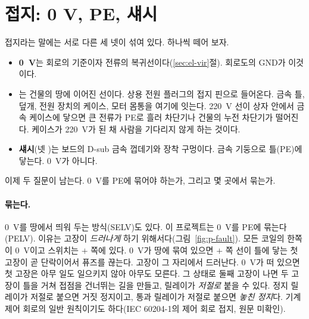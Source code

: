\section{접지: 0 V, PE, 섀시}\label{sec:p-earth}

\Why 접지라는 말에는 서로 다른 세 넷이 섞여 있다. 하나씩 떼어 보자.
\begin{itemize}
\item \textbf{0~V}는 회로의 기준이자 전류의 복귀선이다(\ref{sec:el-vir}절). 회로도의 GND가 이것이다.
\item {}는 건물의 땅에 이어진 선이다. 상용 전원 플러그의 접지 핀으로 들어온다. 금속 틀,
덮개, 전원 장치의 케이스, 모터 몸통을 여기에 잇는다. 220~V 선이 상자 안에서 금속 케이스에 닿으면 큰 전류가 PE로 흘러
차단기나 건물의 누전 차단기가 떨어진다. 케이스가 220~V가 된 채 사람을 기다리지 않게 하는 것이다.
\item \textbf{섀시}(넷 )는 보드의 D-sub 금속 껍데기와 장착 구멍이다. 금속 기둥으로 틀(PE)에 닿는다. 0~V가 아니다.
\end{itemize}

이제 두 질문이 남는다. 0~V를 PE에 묶어야 하는가, 그리고 몇 곳에서 묶는가.

\paragraph{묶는다.} 0~V를 땅에서 띄워 두는 방식(SELV)도 있다. 이 프로젝트는 0~V를 PE에 묶는다(PELV). 이유는 고장이 \emph{드러나게}
하기 위해서다(그림~\ref{fig:p-fault}). 모든 코일의 한쪽이 0~V이고 스위치는 $+$ 쪽에 있다. 0~V가 땅에 묶여 있으면 $+$ 쪽 선이
틀에 닿는 첫 고장이 곧 단락이어서 퓨즈를 끊는다. 고장이 그 자리에서 드러난다. 0~V가 떠 있으면 첫 고장은 아무 일도 일으키지
않아 아무도 모른다. 그 상태로 둘째 고장이 나면 두 고장이 틀을 거쳐 접점을 건너뛰는 길을 만들고, 릴레이가 \emph{저절로} 붙을
수 있다. 정지 릴레이가 저절로 붙으면 거짓 정지이고, 통과 릴레이가 저절로 붙으면 \emph{놓친 정지}다. 기계 제어 회로의 일반
원칙이기도 하다(IEC 60204-1의 제어 회로 접지, 원문 미확인).

